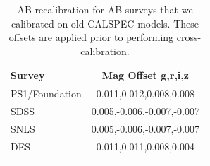 \documentclass[twocolumn]{aastex63}
\begin{document}


\begin{table}
\centering
\begin{tabular}{lc}
\toprule
    Survey & Mag Offset g,r,i,z \\
\hline
      PS1/Foundation & 0.011,0.012,0.008,0.008  \\
      SDSS & 0.005,-0.006,-0.007,-0.007  \\
      SNLS & 0.005,-0.006,-0.007,-0.007 \\
       DES & 0.011,0.011,0.008,0.004 \\
\label{tab:recal}
\end{tabular}
\caption{AB recalibration for AB surveys that we calibrated on old CALSPEC models. These offsets are applied prior to performing cross-calibration.}
\end{table}
\end{document}
